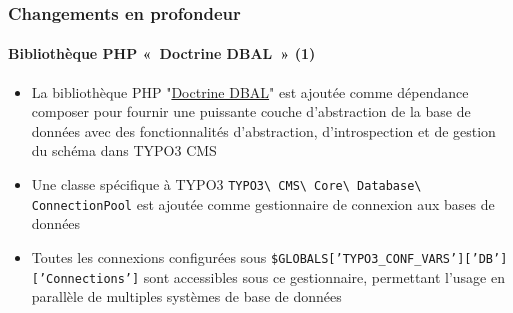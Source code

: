 \begin{frame}[fragile]
	\frametitle{Changements en profondeur}
	\framesubtitle{Bibliothèque PHP «~Doctrine DBAL~» (1)}

	\begin{itemize}

		\item La bibliothèque PHP
			"\href{http://www.doctrine-project.org}{Doctrine DBAL}"
			est ajoutée comme dépendance composer pour fournir une
			puissante couche d'abstraction de la base de données avec des
			fonctionnalités d'abstraction, d'introspection et de gestion du
			schéma dans TYPO3 CMS

		\item Une classe spécifique à TYPO3
			\texttt{TYPO3\textbackslash
				CMS\textbackslash
				Core\textbackslash
				Database\textbackslash
				ConnectionPool}\newline
			est ajoutée comme gestionnaire de connexion aux bases de données

		\item Toutes les connexions configurées sous
			\texttt{\$GLOBALS['TYPO3\_CONF\_VARS']['DB']['Connections']}\newline
			sont accessibles sous ce gestionnaire, permettant l'usage en parallèle
			de multiples systèmes de base de données

	\end{itemize}

\end{frame}

